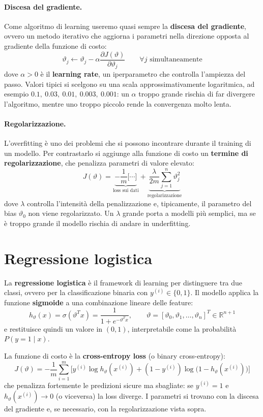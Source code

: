 \paragraph{Discesa del gradiente.}
Come algoritmo di learning useremo quasi sempre la \textbf{discesa del gradiente}, ovvero un metodo iterativo che aggiorna i parametri nella direzione opposta al gradiente della funzione di costo:
\[
\vartheta_j \leftarrow \vartheta_j - \alpha \frac{\partial J(\vartheta)}{\partial \vartheta_j} \qquad \forall j \text{ simultaneamente}
\]
dove $\alpha > 0$ è il \textbf{learning rate}, un iperparametro che controlla l'ampiezza del passo. Valori tipici si scelgono su una scala approssimativamente logaritmica, ad esempio $0.1,\ 0.03,\ 0.01,\ 0.003,\ 0.001$: un $\alpha$ troppo grande rischia di far divergere l'algoritmo, mentre uno troppo piccolo rende la convergenza molto lenta.

\paragraph{Regolarizzazione.}
L'overfitting è uno dei problemi che si possono incontrare durante il training di un modello. Per contrastarlo si aggiunge alla funzione di costo un \textbf{termine di regolarizzazione}, che penalizza parametri di valore elevato:
\[
J(\vartheta) = \underbrace{-\frac{1}{m}\Big[\cdots\Big]}_{\text{loss sui dati}} + \underbrace{\frac{\lambda}{2m}\sum_{j=1}^{n}\vartheta_j^2}_{\text{regolarizzazione}}
\]
dove $\lambda$ controlla l'intensità della penalizzazione e, tipicamente, il parametro del bias $\vartheta_0$ non viene regolarizzato. Un $\lambda$ grande porta a modelli più semplici, ma se è troppo grande il modello rischia di andare in underfitting.

\section{Regressione logistica}
La \textbf{regressione logistica} è il framework di learning per distinguere tra due classi, ovvero per la classificazione binaria con $y^{(i)} \in \{0, 1\}$. Il modello applica la funzione \textbf{sigmoide} a una combinazione lineare delle feature:
\[
h_\vartheta(x) = \sigma(\vartheta^T x) = \frac{1}{1 + e^{-\vartheta^T x}}, \qquad \vartheta = [\vartheta_0, \vartheta_1, \dots, \vartheta_n]^T \in \mathbb{R}^{n+1}
\]
e restituisce quindi un valore in $(0, 1)$, interpretabile come la probabilità $P(y = 1 \mid x)$.

La funzione di costo è la \textbf{cross-entropy loss} (o binary cross-entropy):
\[
J(\vartheta) = -\frac{1}{m}\sum_{i=1}^{m}\Big[y^{(i)}\log h_\vartheta(x^{(i)}) + (1 - y^{(i)})\log\big(1 - h_\vartheta(x^{(i)})\big)\Big]
\]
che penalizza fortemente le predizioni sicure ma sbagliate: se $y^{(i)} = 1$ e $h_\vartheta(x^{(i)}) \to 0$ (o viceversa) la loss diverge. I parametri si trovano con la discesa del gradiente e, se necessario, con la regolarizzazione vista sopra.

